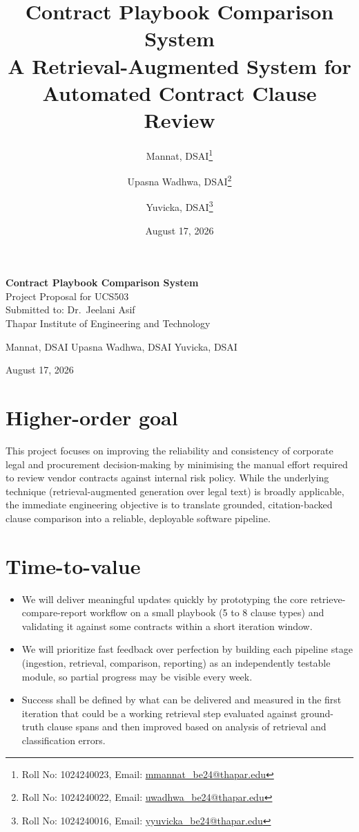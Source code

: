 \documentclass[11pt]{article}
\title{\textbf{Contract Playbook Comparison System}\\[2pt]
\large A Retrieval-Augmented System for Automated Contract Clause Review}
\author{
Mannat, DSAI\thanks{Roll No: 1024240023, Email: \href{mailto:mmannat_be24@thapar.edu}{mmannat\_be24@thapar.edu}}
\and
Upasna Wadhwa, DSAI\thanks{Roll No: 1024240022, Email: \href{mailto:uwadhwa_be24@thapar.edu}{uwadhwa\_be24@thapar.edu}}
\and
Yuvicka, DSAI\thanks{Roll No: 1024240016, Email: \href{mailto:yyuvicka_be24@thapar.edu}{yyuvicka\_be24@thapar.edu}}
}
\date{August 17, 2026}
\newcommand{\secx}[1]{\section{#1}}
\begin{document}
\begin{center}
{\large\bfseries Contract Playbook Comparison System}\\[4pt]
{\normalsize Project Proposal for UCS503}\\[2pt]
{\normalsize Submitted to: Dr.\ Jeelani Asif}\\[2pt]
{\normalsize Thapar Institute of Engineering and Technology}
\end{center}

\vspace{6pt}

\begin{center}
Mannat, DSAI\footnotemark[1] \qquad\qquad
Upasna Wadhwa, DSAI\footnotemark[2] \qquad\qquad
Yuvicka, DSAI\footnotemark[3]
\end{center}

\begin{center}
August 17, 2026
\end{center}


\vspace{10pt}

\secx{Higher-order goal}
This project focuses on improving the reliability and consistency of corporate legal and
procurement decision-making by minimising the manual effort required to review vendor
contracts against internal risk policy. While the underlying technique (retrieval-augmented
generation over legal text) is broadly applicable, the immediate engineering objective is to translate
grounded, citation-backed clause comparison into a reliable, deployable software pipeline.

\secx{Time-to-value}
\begin{itemize}
  \item We will deliver meaningful updates quickly by prototyping the core
  retrieve-compare-report workflow on a small playbook (5 to 8 clause types) and
  validating it against some contracts within a short iteration window.
  \item We will prioritize fast feedback over perfection by building each pipeline
  stage (ingestion, retrieval, comparison, reporting) as an independently
  testable module, so partial progress may be visible every week.
  \item Success shall be defined by what can be delivered and measured in the first
  iteration that could be a working retrieval step evaluated against ground-truth clause
  spans and then improved based on analysis of retrieval and classification errors.
\end{itemize}
\end{document}

